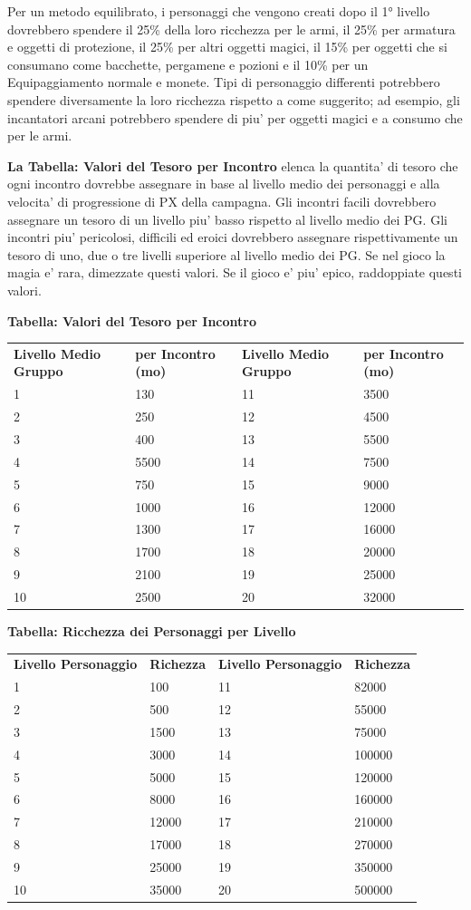 \documentclass[a4paper,11pt,twoside,openany]{book}
\begin{document}
{		Per un metodo equilibrato, i personaggi che vengono creati dopo il 1° livello dovrebbero spendere il 25\% della loro ricchezza per le armi, il 25\% per armatura e oggetti di protezione, il 25\% per altri oggetti magici, il 15\% per oggetti che si consumano come bacchette, pergamene e pozioni e il 10\% per un Equipaggiamento normale e monete. Tipi di personaggio differenti potrebbero spendere diversamente la loro ricchezza rispetto a come suggerito; ad esempio, gli incantatori arcani potrebbero spendere di piu' per oggetti magici e a consumo che per le armi.
		
		\textbf{La Tabella: Valori del Tesoro per Incontro} elenca la quantita' di tesoro che ogni incontro dovrebbe assegnare in base al livello medio dei personaggi e alla velocita' di progressione di PX della campagna. Gli incontri facili dovrebbero assegnare un tesoro di un livello piu' basso rispetto al livello medio dei PG. Gli incontri piu' pericolosi, difficili ed eroici dovrebbero assegnare rispettivamente un tesoro di uno, due o tre livelli superiore al livello medio dei PG. Se nel gioco la magia e' rara, dimezzate questi valori. Se il gioco e' piu' epico, raddoppiate questi valori.
		
		\bigskip
		
		\textbf{Tabella: Valori del Tesoro per Incontro}
		
		\begin{tabular}{llll}
			\toprule
			\textbf{Livello Medio Gruppo} & \textbf{per Incontro (mo)} & \textbf{Livello Medio Gruppo} & \textbf{per Incontro (mo)}\tabularnewline
			1 & 130 & 11 & 3500\tabularnewline
			2 & 250 & 12 & 4500\tabularnewline
			3 & 400 & 13 & 5500\tabularnewline
			4 & 5500 & 14 & 7500\tabularnewline
			5 & 750 & 15 & 9000\tabularnewline
			6 & 1000 & 16 & 12000\tabularnewline
			7 & 1300 & 17 & 16000\tabularnewline
			8 & 1700 & 18 & 20000\tabularnewline
			9 & 2100 & 19 & 25000\tabularnewline
			10 & 2500 & 20 & 32000\tabularnewline
		\end{tabular}
		\bigskip
		
		\textbf{Tabella: Ricchezza dei Personaggi per Livello}
		
		\bigskip
		
		\begin{tabular}{llll}
			\toprule
			\textbf{Livello Personaggio} & \textbf{Richezza} &\textbf{ Livello Personaggio} & \textbf{Richezza}\tabularnewline
			1 & 100 & 11 & 82000\tabularnewline
			2 & 500 & 12 & 55000\tabularnewline
			3 & 1500 & 13 & 75000\tabularnewline
			4 & 3000 & 14 & 100000\tabularnewline
			5 & 5000 & 15 & 120000\tabularnewline
			6 & 8000 & 16 & 160000\tabularnewline
			7 & 12000 & 17 & 210000\tabularnewline
			8 & 17000 & 18 & 270000\tabularnewline
			9 & 25000 & 19 & 350000\tabularnewline
			10 & 35000 & 20 & 500000\tabularnewline
		\end{tabular}
		
}
\end{document}

